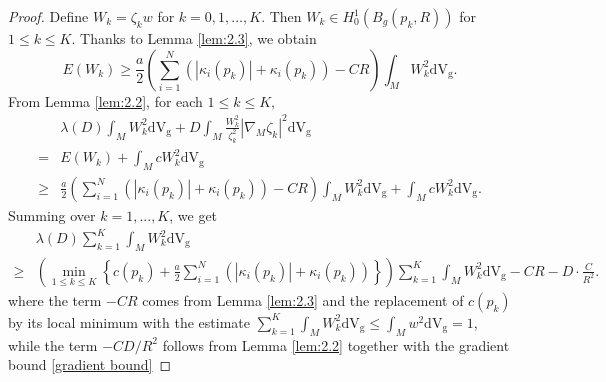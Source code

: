 \documentclass[12pt,reqno]{amsart}
\newcommand{\V}{\mathrm{d} \mathrm{V_g}}
\newcommand{\red}{\textcolor[rgb]{1.00,0.00,0.00}}
\newcommand{\grad}{\nabla_M}
\numberwithin{equation}{section}
\begin{document}
\begin{proof}
Define \(W_k = \zeta_k w\) for \(k = 0, 1, \ldots, K\). Then $W_k\in H_0^1(B_g(p_k,R))$ for \(1\leq k\le K\).
Thanks to Lemma \ref{lem:2.3}, we obtain
\[
E(W_k) \geq \frac{a}{2} \left( \sum_{i=1}^N \left( |\kappa_i(p_k)| + \kappa_i(p_k) \right) - C R \right) \int_M W_k^2 \V.
\]
From Lemma \ref{lem:2.2}, for each \(1\le k\le K\),
\begin{align*}
   & \lambda(D) \int_M W_k^2 \V + D \int_M \frac{W_k^2}{\zeta_k^2} |\grad \zeta_k|^2 \V\\=&
E(W_k) +\int_M    c W_k^2   \V \\
\ge&
   \frac{a}{2} \left( \sum_{i=1}^N \left( |\kappa_i(p_k)| + \kappa_i(p_k) \right) - C R \right) \int_M W_k^2 \V
   +\int_M  c W_k^2 \V. 
\end{align*}
Summing over $k=1,...,K$, we get
\begin{align}
&\lambda(D) \sum_{k=1}^K \int_M W_k^2 \V \label{I:lb} \\
\geq& \left( \min_{1 \leq k \leq K} \left\{ c(p_k) + \frac{a}{2} \sum_{i=1}^N (|\kappa_i(p_k)| + \kappa_i(p_k)) \right\}\right)\sum_{k=1}^K \int_M W_k^2 \V  - C R  - D \cdot \frac{C}{R^2}.\nonumber
\end{align}
where the term \(-CR\) comes from Lemma \ref{lem:2.3} and the replacement of \(c(p_k)\) by its local minimum with the estimate \(\sum_{k=1}^K\int_M W_k^2\V\le \int_M w^2\V=1\), while the term \(-C D/R^2\) follows from Lemma \ref{lem:2.2} together with the gradient bound \eqref{gradient bound}


\end{proof}
\end{document}

